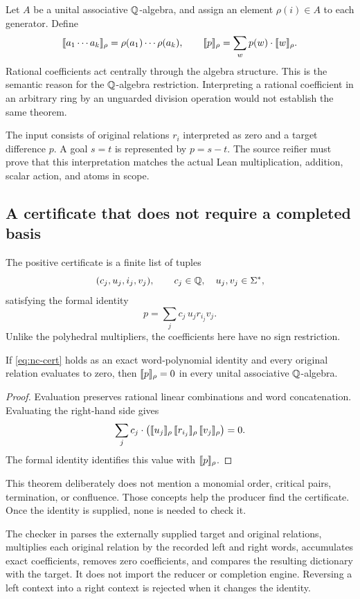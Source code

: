 Let \(A\) be a unital associative \(\mathbb{Q}\)-algebra, and assign an element \(\rho(i)\in A\) to each generator. Define
\[
 \llbracket a_1\cdots a_k\rrbracket_\rho=\rho(a_1)\cdots\rho(a_k),
 \qquad
 \llbracket p\rrbracket_\rho=\sum_w p(w)\mathbin{\cdot}\llbracket w\rrbracket_\rho.
\]
Rational coefficients act centrally through the algebra structure. This is the semantic reason for the \(\mathbb{Q}\)-algebra restriction. Interpreting a rational coefficient in an arbitrary ring by an unguarded division operation would not establish the same theorem.

The input consists of original relations \(r_i\) interpreted as zero and a target difference \(p\). A goal \(s=t\) is represented by \(p=s-t\). The source reifier must prove that this interpretation matches the actual Lean multiplication, addition, scalar action, and atoms in scope.

\subsection{A certificate that does not require a completed basis}
The positive certificate is a finite list of tuples
\[
 (c_j,u_j,i_j,v_j),\qquad c_j\in\mathbb{Q},\quad u_j,v_j\in\Sigma^*,
\]
satisfying the formal identity
\begin{equation}\label{eq:nc-cert}
 p=\sum_j c_j\,u_jr_{i_j}v_j.
\end{equation}
Unlike the polyhedral multipliers, the coefficients here have no sign restriction.

\begin{theorem}\label{thm:nc-sound}
If \eqref{eq:nc-cert} holds as an exact word-polynomial identity and every original relation evaluates to zero, then \(\llbracket p\rrbracket_\rho=0\) in every unital associative \(\mathbb{Q}\)-algebra.
\end{theorem}
\begin{proof}
Evaluation preserves rational linear combinations and word concatenation. Evaluating the right-hand side gives
\[
 \sum_j c_j\mathbin{\cdot}
 \bigl(\llbracket u_j\rrbracket_\rho\,\llbracket r_{i_j}\rrbracket_\rho\,\llbracket v_j\rrbracket_\rho\bigr)=0.
\]
The formal identity identifies this value with \(\llbracket p\rrbracket_\rho\).
\end{proof}

This theorem deliberately does not mention a monomial order, critical pairs, termination, or confluence. Those concepts help the producer find the certificate. Once the identity is supplied, none is needed to check it.

The checker in  parses the externally supplied target and original relations, multiplies each original relation by the recorded left and right words, accumulates exact coefficients, removes zero coefficients, and compares the resulting dictionary with the target. It does not import the reducer or completion engine. Reversing a left context into a right context is rejected when it changes the identity.

